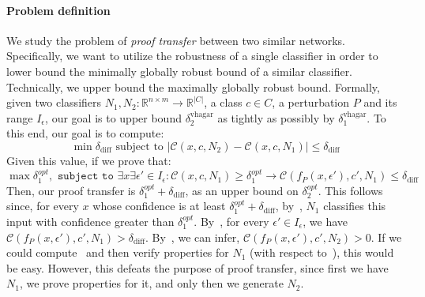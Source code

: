 \documentclass[11pt]{article}
\begin{document}
\paragraph{Problem definition} 
We study the problem of \emph{proof transfer} between two similar networks. 
Specifically, we want to utilize the robustness of a single classifier in order to lower bound the minimally globally robust bound of a similar classifier. 
Technically, we upper bound the maximally globally robust bound.
Formally, given two classifiers $N_1,N_2: \mathbb{R}^{n \times m} \rightarrow {\mathbb{R}}^{|C|}$, a class $c\in{C}$, a perturbation $P$ and its range $I_\epsilon$, our goal is to upper bound $\delta_2^\text{vhagar}$ as tightly as possibly by $\delta_1^\text{vhagar}$. To this end, our goal is to compute:
\begin{equation}\label{eq:diff}
\min \delta_\text{diff}\text{ subject to } |\mathcal{C}(x,c,N_2)-\mathcal{C}(x,c,N_1)|\leq \delta_\text{diff}
\end{equation}
Given this value, if we prove that: 
\begin{equation}\label{eq:vagdiff}
\max{\delta_1^{opt}}, \texttt{ subject to } \exists{x}\exists{\epsilon'}\in{I_\epsilon}: \mathcal{C}(x,c,N_1) \geq \delta_1^{opt} \rightarrow \mathcal{C}(f_P(x,\epsilon'),c',N_1)\leq \delta_\text{diff}
\end{equation}
Then, our proof transfer is $\delta_1^{opt}+\delta_\text{diff}$, as an upper bound on $\delta_2^{opt}$. This follows since, for every $x$ whose confidence is at least  $\delta_1^{opt}+\delta_\text{diff}$, by~, $N_1$ classifies this input with confidence greater than $\delta_1^{opt}$. By~, for every $\epsilon'\in I_\epsilon$, we have $\mathcal{C}(f_P(x,\epsilon'),c',N_1)>\delta_\text{diff}$. By~, we can infer, $\mathcal{C}(f_P(x,\epsilon'),c',N_2)>0$.
If we could compute~ and then verify properties for $N_1$ (with respect to~), this would be easy. However, this defeats the purpose of proof transfer, since first we have $N_1$, we prove properties for it, and only then we generate $N_2$. 
\end{document}
